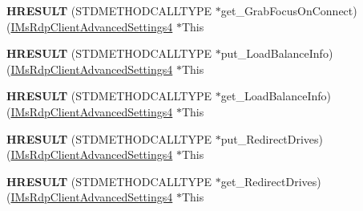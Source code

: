 \begin{DoxyCompactItemize}
\item 
\mbox{\label{struct_m_s_t_s_c_lib_1_1_i_ms_rdp_client_advanced_settings4_vtbl_ac1446689882941b657e9ab9dbab84cbe}} 
{\bfseries H\+R\+E\+S\+U\+LT} (S\+T\+D\+M\+E\+T\+H\+O\+D\+C\+A\+L\+L\+T\+Y\+PE $\ast$get\+\_\+\+Grab\+Focus\+On\+Connect)(\hyperlink{interface_m_s_t_s_c_lib_1_1_i_ms_rdp_client_advanced_settings4}{I\+Ms\+Rdp\+Client\+Advanced\+Settings4} $\ast$This
\item 
\mbox{\label{struct_m_s_t_s_c_lib_1_1_i_ms_rdp_client_advanced_settings4_vtbl_a9998f27868634c1e62a0aff388664910}} 
{\bfseries H\+R\+E\+S\+U\+LT} (S\+T\+D\+M\+E\+T\+H\+O\+D\+C\+A\+L\+L\+T\+Y\+PE $\ast$put\+\_\+\+Load\+Balance\+Info)(\hyperlink{interface_m_s_t_s_c_lib_1_1_i_ms_rdp_client_advanced_settings4}{I\+Ms\+Rdp\+Client\+Advanced\+Settings4} $\ast$This
\item 
\mbox{\label{struct_m_s_t_s_c_lib_1_1_i_ms_rdp_client_advanced_settings4_vtbl_a224271b90d70a7d838c00b8aaf19ce92}} 
{\bfseries H\+R\+E\+S\+U\+LT} (S\+T\+D\+M\+E\+T\+H\+O\+D\+C\+A\+L\+L\+T\+Y\+PE $\ast$get\+\_\+\+Load\+Balance\+Info)(\hyperlink{interface_m_s_t_s_c_lib_1_1_i_ms_rdp_client_advanced_settings4}{I\+Ms\+Rdp\+Client\+Advanced\+Settings4} $\ast$This
\item 
\mbox{\label{struct_m_s_t_s_c_lib_1_1_i_ms_rdp_client_advanced_settings4_vtbl_a10ea8344d4292ec8b51ad805e4ff940b}} 
{\bfseries H\+R\+E\+S\+U\+LT} (S\+T\+D\+M\+E\+T\+H\+O\+D\+C\+A\+L\+L\+T\+Y\+PE $\ast$put\+\_\+\+Redirect\+Drives)(\hyperlink{interface_m_s_t_s_c_lib_1_1_i_ms_rdp_client_advanced_settings4}{I\+Ms\+Rdp\+Client\+Advanced\+Settings4} $\ast$This
\item 
\mbox{\label{struct_m_s_t_s_c_lib_1_1_i_ms_rdp_client_advanced_settings4_vtbl_aed51c9bbb558e3d7a5d2fb7097e815fe}} 
{\bfseries H\+R\+E\+S\+U\+LT} (S\+T\+D\+M\+E\+T\+H\+O\+D\+C\+A\+L\+L\+T\+Y\+PE $\ast$get\+\_\+\+Redirect\+Drives)(\hyperlink{interface_m_s_t_s_c_lib_1_1_i_ms_rdp_client_advanced_settings4}{I\+Ms\+Rdp\+Client\+Advanced\+Settings4} $\ast$This
\item 

\end{DoxyCompactItemize}

